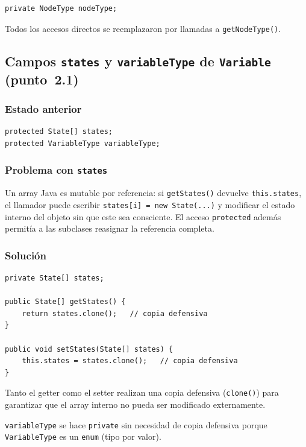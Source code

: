 \documentclass[11pt,a4paper]{article}
\newcommand{\code}[1]{\texttt{#1}}
\begin{document}
\begin{lstlisting}
private NodeType nodeType;
\end{lstlisting}

Todos los accesos directos se reemplazaron por llamadas a
\code{getNodeType()}.

\subsection{Campos \code{states} y \code{variableType} de \code{Variable}
            (punto~2.1)}

\subsubsection*{Estado anterior}

\begin{lstlisting}
protected State[] states;
protected VariableType variableType;
\end{lstlisting}

\subsubsection*{Problema con \code{states}}

Un array Java es mutable por referencia: si \code{getStates()} devuelve
\code{this.states}, el llamador puede escribir \code{states[i] = new State(...)}
y modificar el estado interno del objeto sin que este sea consciente. El
acceso \code{protected} además permitía a las subclases reasignar la
referencia completa.

\subsubsection*{Solución}

\begin{lstlisting}
private State[] states;

public State[] getStates() {
    return states.clone();   // copia defensiva
}

public void setStates(State[] states) {
    this.states = states.clone();   // copia defensiva
}
\end{lstlisting}

Tanto el getter como el setter realizan una copia defensiva
(\code{clone()}) para garantizar que el array interno no pueda ser
modificado externamente.

\code{variableType} se hace \code{private} sin necesidad de copia
defensiva porque \code{VariableType} es un \code{enum} (tipo por
valor).
\end{document}
